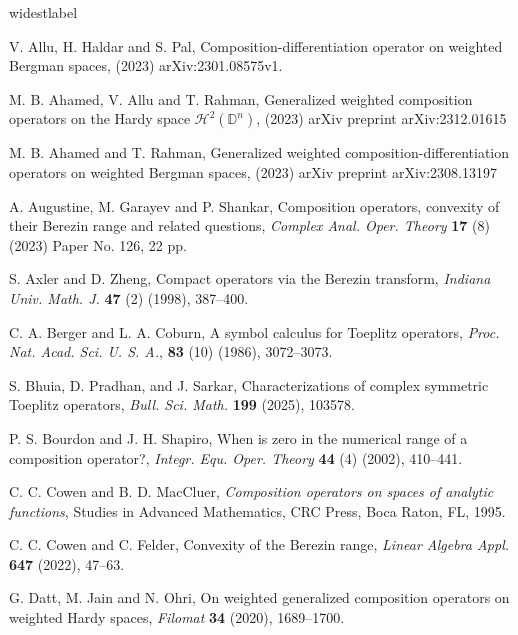 \documentclass[12pt, reqno]{amsart}
\theoremstyle{definition}
\theoremstyle{remark}
\numberwithin{equation}{section}
\begin{document}
   
\begin{thebibliography}{widestlabel}
	
	  {\sc V. Allu, H. Haldar} and {\sc S. Pal}, Composition-differentiation operator on weighted
	Bergman spaces, (2023) arXiv:2301.08575v1.
	
	 {\sc M. B. Ahamed, V. Allu} and {\sc T. Rahman}, Generalized weighted composition operators on the Hardy space $ \mathcal{H}^2(\mathbb {D}^n)$, (2023) arXiv preprint arXiv:2312.01615
	
	 {\sc M. B. Ahamed} and {\sc T. Rahman}, Generalized weighted composition-differentiation operators on weighted Bergman spaces, (2023) arXiv preprint arXiv:2308.13197
	
	
	 {\sc A. Augustine, M. Garayev} and {\sc P. Shankar}, Composition operators, convexity of their Berezin range and related questions, \textit{Complex Anal. Oper. Theory} {\bf 17} (8) (2023) Paper No. 126, 22 pp.
	
	
	  {\sc S. Axler} and {\sc D. Zheng}, Compact operators via the Berezin transform, \textit{Indiana Univ. Math. J.} {\bf 47} (2) (1998), 387--400.
	
	
	  {\sc C. A. Berger} and {\sc L. A. Coburn}, A symbol calculus for Toeplitz operators, \textit{Proc. Nat. Acad. Sci. U. S. A.}, {\bf 83} (10) (1986), 3072--3073.
	
 {\sc S. Bhuia, D. Pradhan}, and {\sc J. Sarkar}, Characterizations of complex symmetric Toeplitz operators, \textit{Bull. Sci. Math.} {\bf 199} (2025), 103578.	
    
     {\sc P. S. Bourdon} and {\sc J. H. Shapiro}, When is zero in the numerical range of a composition operator?, \textit{Integr. Equ. Oper. Theory} {\bf 44} (4) (2002),  410--441.
	
	 {\sc C. C. Cowen} and {\sc B. D. MacCluer}, \textit{Composition operators on spaces of analytic functions}, Studies in Advanced Mathematics, CRC Press, Boca Raton, FL, 1995.
	
  {\sc C. C. Cowen} and {\sc C. Felder}, Convexity of the Berezin range, \textit{Linear Algebra Appl.} {\bf647} (2022), 47--63.


 

 {\sc G. Datt, M. Jain} and {\sc N. Ohri}, On weighted generalized composition operators on weighted Hardy spaces, \textit{Filomat} {\bf34} (2020), 1689--1700. 






\end{thebibliography}
\end{document}
